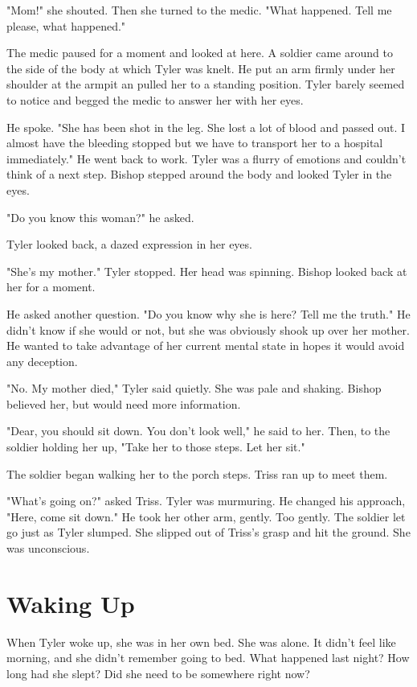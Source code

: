\documentclass[courier]{sffms}
\begin{document}
"Mom!" she shouted. Then she turned to the
medic. "What happened. Tell me please, what
happened."

The medic paused for a moment and looked at
here. A soldier came around to the side of the body
at which Tyler was knelt. He put an arm firmly
under her shoulder at the armpit an pulled her
to a standing position. Tyler barely seemed to
notice and begged the medic to answer her with
her eyes.

He spoke. "She has been shot in the leg. She
lost a lot of blood and passed out. I almost
have the bleeding stopped but we have to
transport her to a hospital immediately."
He went back to work. Tyler was a flurry
of emotions and couldn't think of a next step.
Bishop stepped around the body and looked
Tyler in the eyes.

"Do you know this woman?" he asked.

Tyler looked back, a dazed expression in her
eyes.

"She's my mother." Tyler stopped. Her head
was spinning. Bishop looked back at her for a
moment.

He asked another question. "Do you know why
she is here? Tell me the truth." He didn't know
if she would or not, but she was obviously
shook up over her mother. He wanted to take
advantage of her current mental state in hopes
it would avoid any deception.

"No. My mother died," Tyler said quietly. She
was pale and shaking. Bishop believed her,
but would need more information.

"Dear, you should sit down. You don't look
well," he said to her. Then, to the soldier
holding her up, "Take her to those steps. Let
her sit."

The soldier began walking her to the porch steps.
Triss ran up to meet them.

"What's going on?" asked Triss. Tyler was murmuring.
He changed his approach, "Here, come sit down."
He took her other arm, gently. Too gently. The
soldier let go just as Tyler slumped. She slipped
out of Triss's grasp and hit the ground. She was
unconscious.

\chapter{Waking Up}
When Tyler woke up, she was in her own bed.
She was alone. It didn't feel like morning, and
she didn't remember going to bed. What
happened last night? How long had she slept?
Did she need to be somewhere right now?
\end{document}
